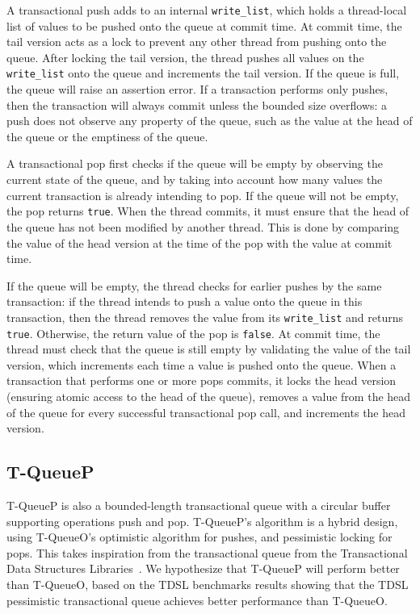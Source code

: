 A transactional push adds to an internal \texttt{write\_list}, which holds a thread-local list of values to be pushed onto the queue at commit time. At commit time, the tail version acts as a lock to prevent any other thread from pushing onto the queue. After locking the tail version, the thread pushes all values on the \texttt{write\_list} onto the queue and increments the tail version. If the queue is full, the queue will raise an assertion error.
If a transaction performs only pushes, then the transaction will always commit unless the bounded size overflows: a push does not observe any property of the queue, such as the value at the head of the queue or the emptiness of the queue. 

A transactional pop first checks if the queue will be empty by observing the current state of the queue, and by taking into account how many values the current transaction is already intending to pop. If the queue will not be empty, the pop returns \texttt{true}. When the thread commits, it must ensure that the head of the queue has not been modified by another thread. This is done by comparing the value of the head version at the time of the pop with the value at commit time. 

If the queue will be empty, the thread checks for earlier pushes by the same transaction: if the thread intends to push a value onto the queue in this transaction, then the thread removes the value from its \texttt{write\_list} and returns \texttt{true}. Otherwise, the return value of the pop is \texttt{false}. At commit time, the thread must check that the queue is still empty by validating the value of the tail version, which increments each time a value is pushed onto the queue.
When a transaction that performs one or more pops commits, it locks the head version (ensuring atomic access to the head of the queue), removes a value from the head of the queue for every successful transactional pop call, and increments the head version.


\subsection{T-QueueP}
T-QueueP is also a bounded-length transactional queue with a circular buffer supporting operations push and pop. T-QueueP's algorithm is a hybrid design, using T-QueueO's optimistic algorithm for pushes, and pessimistic locking for pops. This takes inspiration from the transactional queue from the Transactional Data Structures Libraries~\cite{tdsl}. We hypothesize that T-QueueP will perform better than T-QueueO, based on the TDSL benchmarks results showing that the TDSL pessimistic transactional queue achieves better performance than T-QueueO. 

